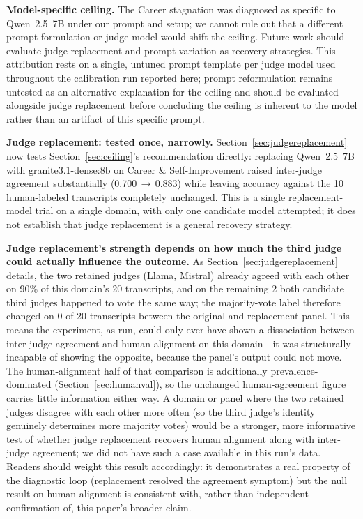 \documentclass[11pt]{article}
\begin{document}
\textbf{Model-specific ceiling.} The Career stagnation was diagnosed as specific to Qwen~2.5~7B under our prompt and setup; we
cannot rule out that a different prompt formulation or judge model would shift the ceiling.
Future work should evaluate judge replacement and prompt variation as recovery strategies.
This attribution rests on a single, untuned prompt template per judge model
used throughout the calibration run reported here; prompt reformulation
remains untested as an alternative explanation for the ceiling and should be
evaluated alongside judge replacement before concluding the ceiling is
inherent to the model rather than an artifact of this specific prompt.

\textbf{Judge replacement: tested once, narrowly.} Section~\ref{sec:judgereplacement}
now tests Section~\ref{sec:ceiling}'s recommendation directly: replacing
Qwen~2.5~7B with granite3.1-dense:8b on Career \& Self-Improvement raised
inter-judge agreement substantially (0.700\,$\to$\,0.883) while leaving
accuracy against the 10 human-labeled transcripts completely unchanged.
This is a single replacement-model trial on a single domain, with only one
candidate model attempted; it does not establish that judge replacement is
a general recovery strategy.

\textbf{Judge replacement's strength depends on how much the third judge
could actually influence the outcome.} As Section~\ref{sec:judgereplacement}
details, the two retained judges (Llama, Mistral) already agreed with each
other on 90\% of this domain's 20 transcripts, and on the remaining 2 both
candidate third judges happened to vote the same way; the majority-vote
label therefore changed on 0 of 20 transcripts between the original and
replacement panel. This means the experiment, as run, could only ever have shown a
dissociation between inter-judge agreement and human alignment on this
domain---it was structurally incapable of showing the opposite, because
the panel's output could not move.
The human-alignment half of that comparison is additionally
prevalence-dominated (Section~\ref{sec:humanval}), so the unchanged
human-agreement figure carries little information either way. A domain or panel where the two
retained judges disagree with each other more often (so the third judge's
identity genuinely determines more majority votes) would be a stronger,
more informative test of whether judge replacement recovers human
alignment along with inter-judge agreement; we did not have such a case
available in this run's data. Readers should weight this result
accordingly: it demonstrates a real property of the diagnostic loop
(replacement resolved the agreement symptom) but the null result on human
alignment is consistent with, rather than independent confirmation of,
this paper's broader claim.
\end{document}
